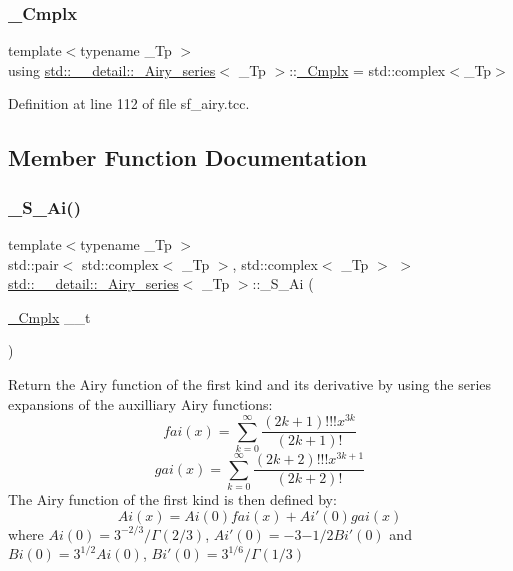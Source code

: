 \subsubsection{\texorpdfstring{\+\_\+\+Cmplx}{\_Cmplx}}
{\footnotesize\ttfamily template$<$typename \+\_\+\+Tp $>$ \\
using \hyperlink{classstd_1_1____detail_1_1__Airy__series}{std\+::\+\_\+\+\_\+detail\+::\+\_\+\+Airy\+\_\+series}$<$ \+\_\+\+Tp $>$\+::\hyperlink{classstd_1_1____detail_1_1__Airy__series_ab41161caa54609f4735987fbaed41d9d}{\+\_\+\+Cmplx} =  std\+::complex$<$\+\_\+\+Tp$>$}



Definition at line 112 of file sf\+\_\+airy.\+tcc.



\subsection{Member Function Documentation}
\mbox{\label{classstd_1_1____detail_1_1__Airy__series_a1de7c7a43d6080a2d666d0f1d7067199}} 
\subsubsection{\texorpdfstring{\+\_\+\+S\+\_\+\+Ai()}{\_S\_Ai()}}
{\footnotesize\ttfamily template$<$typename \+\_\+\+Tp $>$ \\
std\+::pair$<$ std\+::complex$<$ \+\_\+\+Tp $>$, std\+::complex$<$ \+\_\+\+Tp $>$ $>$ \hyperlink{classstd_1_1____detail_1_1__Airy__series}{std\+::\+\_\+\+\_\+detail\+::\+\_\+\+Airy\+\_\+series}$<$ \+\_\+\+Tp $>$\+::\+\_\+\+S\+\_\+\+Ai (\begin{DoxyParamCaption}\item[{\hyperlink{classstd_1_1____detail_1_1__Airy__series_ab41161caa54609f4735987fbaed41d9d}{\+\_\+\+Cmplx}}]{\+\_\+\+\_\+t }\end{DoxyParamCaption})\hspace{0.3cm}{\ttfamily [static]}}

Return the Airy function of the first kind and its derivative by using the series expansions of the auxilliary Airy functions\+: \[ fai(x) = \sum_{k=0}^\infty \frac{(2k+1)!!!x^{3k}}{(2k+1)!} \] \[ gai(x) = \sum_{k=0}^\infty \frac{(2k+2)!!!x^{3k+1}}{(2k+2)!} \] The Airy function of the first kind is then defined by\+: \[ Ai(x) = Ai(0)fai(x) + Ai'(0)gai(x) \] where $ Ai(0) = 3^{-2/3}/\Gamma(2/3) $, $ Ai'(0) = -3{-1/2}Bi'(0) $ and $ Bi(0) = 3^{1/2}Ai(0) $, $ Bi'(0) = 3^{1/6}/\Gamma(1/3) $


